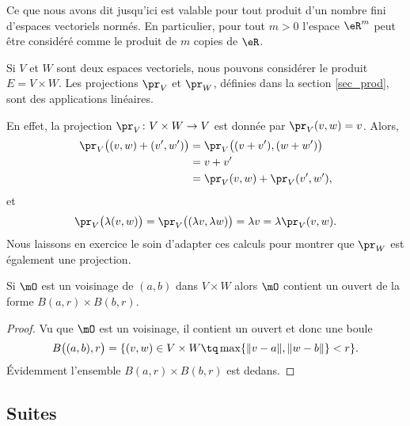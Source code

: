 Ce que nous avons dit jusqu'ici est valable pour tout produit d'un nombre fini d'espaces vectoriels normés. En particulier, pour tout $m>0$  l'espace  $\eR^m$ peut être considéré comme le produit de $m$ copies de $\eR$. 

\begin{example}
	Si $V$ et $W$ sont deux espaces vectoriels, nous pouvons considérer le produit $E=V\times W$. Les projections $\pr_V$ et $\pr_W$, définies dans la section \ref{sec_prod}, sont des applications linéaires. 

	En effet, la projection $\pr_V\colon V\times W\to V$ est donnée par $\pr_V(v,w)=v$. Alors,
	\begin{equation}
		\begin{aligned}[]
			\pr_V\big( (v,w)+(v',w') \big)&=\pr_V\big( (v+v'),(w+w') \big)\\
			&=v+v'\\
			&=\pr_V(v,w)+\pr_V(v',w'),
		\end{aligned}
	\end{equation}
	et
	\begin{equation}
		\pr_V\big( \lambda(v,w) \big)=\pr_V\big( (\lambda v,\lambda w) \big)=\lambda v=\lambda\pr_V(v,w).
	\end{equation}
	Nous laissons en exercice le soin d'adapter ces calculs pour montrer que $\pr_W$ est également une projection.
\end{example}

\begin{proposition} \label{PropDXR_KbaLC}
    Si \( \mO\) est un voisinage de \( (a,b)\) dans \( V\times W\) alors \( \mO\) contient un ouvert de la forme \( B(a,r)\times B(b,r)\).
\end{proposition}

\begin{proof}
    Vu que \( \mO\) est un voisinage, il contient un ouvert et donc une boule
    \begin{equation}
        B\big( (a,b),r \big)=\{ (v,w)\in V\times W\tq \max\{ \| v-a \|,\| w-b \| \}< r \}.
    \end{equation}
    Évidemment l'ensemble \( B(a,r)\times B(b,r)\) est dedans.
\end{proof}

\subsection{Suites}

